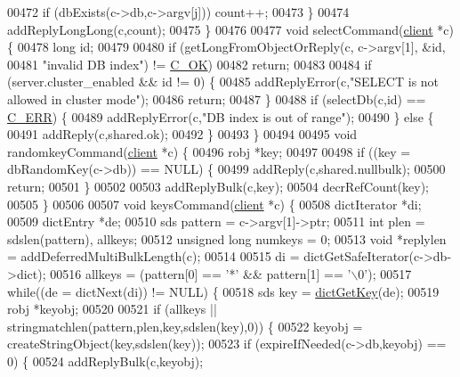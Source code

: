 \begin{DoxyCode}
00472         \textcolor{keywordflow}{if} (dbExists(c->db,c->argv[j])) count++;
00473     \}
00474     addReplyLongLong(c,count);
00475 \}
00476 
00477 \textcolor{keywordtype}{void} selectCommand(\hyperlink{structclient}{client} *c) \{
00478     \textcolor{keywordtype}{long} id;
00479 
00480     \textcolor{keywordflow}{if} (getLongFromObjectOrReply(c, c->argv[1], &id,
00481         \textcolor{stringliteral}{"invalid DB index"}) != \hyperlink{server_8h_a303769ef1065076e68731584e758d3e1}{C\_OK})
00482         \textcolor{keywordflow}{return};
00483 
00484     \textcolor{keywordflow}{if} (server.cluster\_enabled && id != 0) \{
00485         addReplyError(c,\textcolor{stringliteral}{"SELECT is not allowed in cluster mode"});
00486         \textcolor{keywordflow}{return};
00487     \}
00488     \textcolor{keywordflow}{if} (selectDb(c,id) == \hyperlink{server_8h_af98ac28d5f4d23d7ed5985188e6fb7d1}{C\_ERR}) \{
00489         addReplyError(c,\textcolor{stringliteral}{"DB index is out of range"});
00490     \} \textcolor{keywordflow}{else} \{
00491         addReply(c,shared.ok);
00492     \}
00493 \}
00494 
00495 \textcolor{keywordtype}{void} randomkeyCommand(\hyperlink{structclient}{client} *c) \{
00496     robj *key;
00497 
00498     \textcolor{keywordflow}{if} ((key = dbRandomKey(c->db)) == NULL) \{
00499         addReply(c,shared.nullbulk);
00500         \textcolor{keywordflow}{return};
00501     \}
00502 
00503     addReplyBulk(c,key);
00504     decrRefCount(key);
00505 \}
00506 
00507 \textcolor{keywordtype}{void} keysCommand(\hyperlink{structclient}{client} *c) \{
00508     dictIterator *di;
00509     dictEntry *de;
00510     sds pattern = c->argv[1]->ptr;
00511     \textcolor{keywordtype}{int} plen = sdslen(pattern), allkeys;
00512     \textcolor{keywordtype}{unsigned} \textcolor{keywordtype}{long} numkeys = 0;
00513     \textcolor{keywordtype}{void} *replylen = addDeferredMultiBulkLength(c);
00514 
00515     di = dictGetSafeIterator(c->db->dict);
00516     allkeys = (pattern[0] == \textcolor{stringliteral}{'*'} && pattern[1] == \textcolor{stringliteral}{'\(\backslash\)0'});
00517     \textcolor{keywordflow}{while}((de = dictNext(di)) != NULL) \{
00518         sds key = \hyperlink{dict_8h_a3271c334309904a3086deca94f96e46e}{dictGetKey}(de);
00519         robj *keyobj;
00520 
00521         \textcolor{keywordflow}{if} (allkeys || stringmatchlen(pattern,plen,key,sdslen(key),0)) \{
00522             keyobj = createStringObject(key,sdslen(key));
00523             \textcolor{keywordflow}{if} (expireIfNeeded(c->db,keyobj) == 0) \{
00524                 addReplyBulk(c,keyobj);

\end{DoxyCode}
